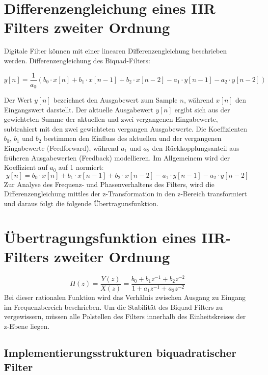 \documentclass[
  ngerman,
  letterpaper,
  DIV=11]{scrreprt}
\begin{document}
\chapter{Differenzengleichung eines IIR Filters zweiter
Ordnung}\label{differenzengleichung-eines-iir-filters-zweiter-ordnung}

Digitale Filter können mit einer linearen Differenzengleichung
beschrieben werden. Differenzengleichung des Biquad-Filters:

\[
y[n] =  \frac{1}{a_0}(b_0 \cdot x[n] + b_1 \cdot x[n - 1] + b_2 \cdot x[n - 2] - a_1 \cdot y[n - 1] - a_2 \cdot y[n - 2])
\]

Der Wert \(y[n]\) bezeichnet den Ausgabewert zum Sample \(n\), während
\(x[n]\) den Eingangswert darstellt. Der aktuelle Ausgabewert \(y[n]\)
ergibt sich aus der gewichteten Summe der aktuellen und zwei vergangenen
Eingabewerte, subtrahiert mit den zwei gewichteten vergangen
Ausgabewerte. Die Koeffizienten \(b_0\), \(b_1\) und \(b_2\) bestimmen
den Einfluss des aktuellen und der vergangenen Eingabewerte
(Feedforward), während \(a_1\) und \(a_2\) den Rückkopplungsanteil aus
früheren Ausgabewerten (Feedback) modellieren. Im Allgemeinem wird der
Koeffizient auf \(a_0\) auf 1 normiert: \[
y[n] = b_0 \cdot x[n] + b_1 \cdot x[n - 1] + b_2 \cdot x[n - 2] - a_1 \cdot y[n - 1] - a_2 \cdot y[n - 2]
\] Zur Analyse des Frequenz- und Phasenverhaltens des Filters, wird die
Differenzengleichung mittles der z-Transformation in den z-Bereich
transformiert und daraus folgt die folgende Übertragunsfunktion.

\chapter{Übertragungsfunktion eines IIR-Filters zweiter
Ordnung}\label{uxfcbertragungsfunktion-eines-iir-filters-zweiter-ordnung}

\[
H(z) = \frac{Y(z)}{X(z)} = \frac{b_0 + b_1 z^{-1} + b_2 z^{-2}}{1 + a_1 z^{-1} + a_2 z^{-2}}
\] Bei dieser rationalen Funktion wird das Verhälnis zwischen Ausgang zu
Eingang im Frequenzbereich beschrieben. Um die Stabilität des
Biquad-Filters zu vergewissern, müssen alle Polstellen des Filters
innerhalb des Einheitskreises der z-Ebene liegen.

\section{Implementierungsstrukturen biquadratischer
Filter}\label{implementierungsstrukturen-biquadratischer-filter}
\end{document}
